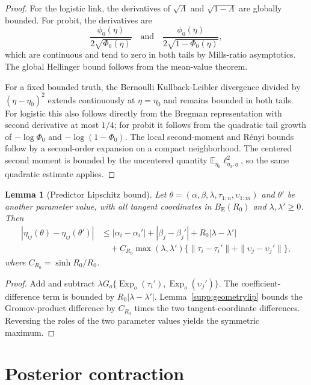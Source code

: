 \documentclass[
  12pt]{article}
\newtheorem{lemma}{Lemma}[section]
\theoremstyle{definition}
\theoremstyle{plain}
\newcommand{\E}{\mathbb E}
\DeclareMathOperator{\Exp}{Exp}
\begin{document}
\begin{proof}
	For the logistic link, the derivatives of $\sqrt\Lambda$ and $\sqrt{1-\Lambda}$ are globally bounded. For probit, the derivatives are
	\[
	\frac{\phi_0(\eta)}{2\sqrt{\Phi_0(\eta)}}
	\quad\text{and}\quad
	\frac{\phi_0(\eta)}{2\sqrt{1-\Phi_0(\eta)}},
	\]
	which are continuous and tend to zero in both tails by Mills-ratio asymptotics. The global Hellinger bound follows from the mean-value theorem.
	
	For a fixed bounded truth, the Bernoulli Kullback-Leibler divergence divided by $(\eta-\eta_0)^2$ extends continuously at $\eta=\eta_0$ and remains bounded in both tails. For logistic this also follows directly from the Bregman representation with second derivative at most $1/4$; for probit it follows from the quadratic tail growth of $-\log\Phi_0$ and $-\log(1-\Phi_0)$. The local second-moment and R\'enyi bounds follow by a second-order expansion on a compact neighborhood. The centered second moment is bounded by the uncentered quantity $\E_{\eta_0}\ell_{\eta_0,\eta}^2$, so the same quadratic estimate applies.
\end{proof}

\begin{lemma}[Predictor Lipschitz bound]
	\label{supp:predictor}
	Let $\theta=(\alpha,\beta,\lambda,\tau_{1:n},\upsilon_{1:m})$ and $\theta'$ be another parameter value, with all tangent coordinates in $B_{\mathrm E}(R_0)$ and $\lambda,\lambda'\ge0$. Then
	\begin{align*}
		|\eta_{ij}(\theta)-\eta_{ij}(\theta')|
		&\le |\alpha_i-\alpha_i'|+|\beta_j-\beta_j'|+R_0|\lambda-\lambda'|\\
		&\quad+C_{R_0}\max(\lambda,\lambda')
		\{\|\tau_i-\tau_i'\|+\|\upsilon_j-\upsilon_j'\|\},
	\end{align*}
	where $C_{R_0}=\sinh R_0/R_0$.
\end{lemma}

\begin{proof}
	Add and subtract $\lambda G_o\{\Exp_o(\tau_i'),\Exp_o(\upsilon_j')\}$. The coefficient-difference term is bounded by $R_0|\lambda-\lambda'|$. Lemma~\ref{supp:geometrylip} bounds the Gromov-product difference by $C_{R_0}$ times the two tangent-coordinate differences. Reversing the roles of the two parameter values yields the symmetric maximum.
\end{proof}

\section{Posterior contraction}
\end{document}
